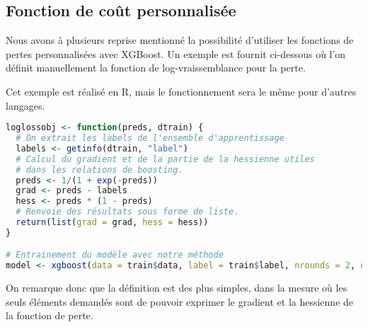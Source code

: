 \subsection{Fonction de coût personnalisée}
\label{sec:cout-perso}
Nous avons à plusieurs reprise mentionné la possibilité d'utiliser les fonctions de pertes personnalisées avec XGBoost. Un exemple est fournit ci-dessous où l'on définit manuellement la fonction de log-vraissemblance pour la perte.

Cet exemple est réalisé en R, mais le fonctionnement sera le même pour d'autres langages.
\begin{lstlisting}[language=R]
loglossobj <- function(preds, dtrain) {
  # On extrait les labels de l'ensemble d'apprentissage
  labels <- getinfo(dtrain, "label")
  # Calcul du gradient et de la partie de la hessienne utiles 
  # dans les relations de boosting.
  preds <- 1/(1 + exp(-preds))
  grad <- preds - labels
  hess <- preds * (1 - preds)
  # Renvoie des résultats sous forme de liste.
  return(list(grad = grad, hess = hess))
}

# Entrainement du modèle avec notre méthode
model <- xgboost(data = train$data, label = train$label, nrounds = 2, objective = loglossobj, eval_metric = "error")
\end{lstlisting}

On remarque donc que la définition est des plus simples, dans la mesure où les seuls éléments demandés sont de pouvoir exprimer le gradient et la hessienne de la fonction de perte.
